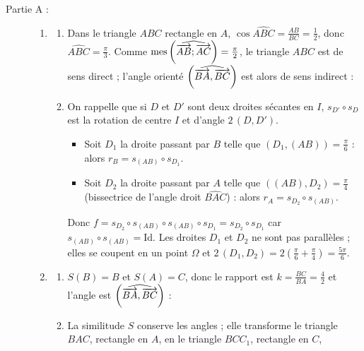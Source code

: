 \begin{description}
	\item[Partie A :]
	\begin{enumerate}
		\item
		\begin{enumerate}
			\item {}
				Dans le triangle $ABC$ rectangle en $A$, $\cos \widehat{ABC} = \frac{AB}{BC} = \frac{1}{2}$, donc $\widehat{ABC} = \frac{\pi}{3}$.
				Comme $\mathrm{mes}\left( \widehat{ \overrightarrow{AB} ; \overrightarrow{AC} } \right) = \frac{\pi}{2}$, le triangle $ABC$ est de sens direct ; l'angle orienté $\left( \widehat{ \overrightarrow{BA} , \overrightarrow{BC} } \right)$ est alors de sens indirect :
				\par\noindent{}
			\item {}
				On rappelle que si $D$ et $D'$ sont deux droites sécantes en $I$, $s_{D'} \circ s_D$ est la rotation de centre $I$ et d'angle $2\,(D , D')$.
				\begin{itemize}
					\item Soit $D_1$ la droite passant par $B$ telle que $\left(D_1 , (AB)\right) = \frac{\pi}{6}$ : alors $r_B = s_{(AB)} \circ s_{D_1}$.
					\item Soit $D_2$ la droite passant par $A$ telle que $\left((AB) , D_2\right) = \frac{\pi}{4}$ (bissectrice de l'angle droit $\widehat{BAC}$) : alors $r_A = s_{D_2} \circ s_{(AB)}$.
				\end{itemize}
				Donc $f = s_{D_2} \circ s_{(AB)} \circ s_{(AB)} \circ s_{D_1} = s_{D_2} \circ s_{D_1}$ car $s_{(AB)} \circ s_{(AB)} = \mathrm{Id}$.
				Les droites $D_1$ et $D_2$ ne sont pas parallèles ; elles se coupent en un point $\Omega$ et $2\,(D_1 , D_2) = 2\left(\frac{\pi}{6} + \frac{\pi}{4}\right) = \frac{5\pi}{6}$.
				\par\noindent{}
		\end{enumerate}
		\item
		\begin{enumerate}
			\item {}
				$S(B) = B$ et $S(A) = C$, donc le rapport est $k = \frac{BC}{BA} = \frac{4}{2}$ et l'angle est $\left( \widehat{ \overrightarrow{BA} , \overrightarrow{BC} } \right)$ :
				\par\noindent{}
			\item {}
				La similitude $S$ conserve les angles ; elle transforme le triangle $BAC$, rectangle en $A$, en le triangle $BCC_1$, rectangle en $C$,

\end{enumerate}
\end{enumerate}
\end{description}

